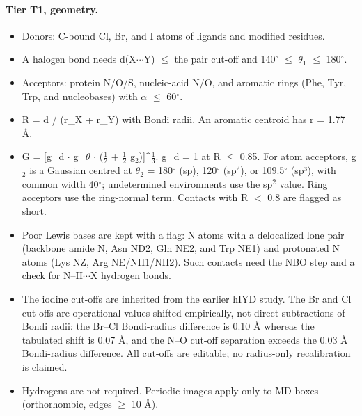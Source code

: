 \documentclass[journal=jcisd8,manuscript=suppinfo]{achemso}
\begin{document}
\begin{singlespace}
\paragraph{Tier T1, geometry.}
\begin{itemize}[nosep,leftmargin=*]
\item Donors: C-bound Cl, Br, and I atoms of ligands and modified residues.
\item A halogen bond needs d(X$\cdots$Y) $\le$ the pair cut-off and 140$^\circ$ $\le$ $\theta_1$ $\le$ 180$^\circ$.
\item Acceptors: protein N/O/S, nucleic-acid N/O, and aromatic rings (Phe, Tyr, Trp, and nucleobases) with $\alpha$ $\le$ 60$^\circ$.
\item R = d / (r\_X + r\_Y) with Bondi radii. An aromatic centroid has r = 1.77 \AA{}.
\item G = [g\_d $\cdot$ g\_$\theta$ $\cdot$ ($\frac12$ + $\frac12$ g$_2$)]\^{}$\frac13$. g\_d = 1 at R $\le$ 0.85. For atom acceptors, g$_2$ is a Gaussian centred at $\theta_2$ = 180$^\circ$ (sp), 120$^\circ$ (sp$^2$), or 109.5$^\circ$ (sp³), with common width 40$^\circ$; undetermined environments use the sp$^2$ value. Ring acceptors use the ring-normal term. Contacts with R $<$ 0.8 are flagged as short.
\item Poor Lewis bases are kept with a flag: N atoms with a delocalized lone pair (backbone amide N, Asn ND2, Gln NE2, and Trp NE1) and protonated N atoms (Lys NZ, Arg NE/NH1/NH2). Such contacts need the NBO step and a check for N--H$\cdots$X hydrogen bonds.
\item The iodine cut-offs are inherited from the earlier hIYD study. The Br and Cl cut-offs are operational values shifted empirically, not direct subtractions of Bondi radii: the Br--Cl Bondi-radius difference is 0.10 \AA{} whereas the tabulated shift is 0.07 \AA{}, and the N--O cut-off separation exceeds the 0.03 \AA{} Bondi-radius difference. All cut-offs are editable; no radius-only recalibration is claimed.
\item Hydrogens are not required. Periodic images apply only to MD boxes (orthorhombic, edges $\ge$ 10 \AA{}).
\end{itemize}

\end{singlespace}
\end{document}
